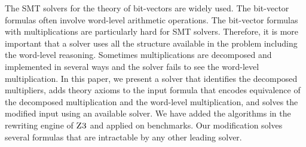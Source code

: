 %
The SMT solvers for the theory of bit-vectors are widely used.
%
The bit-vector formulas often involve word-level arithmetic
operations.
%
The bit-vector formulas with multiplications
are particularly hard for SMT solvers.
%
Therefore, it is more important that a solver uses all 
the structure available in the problem including the
word-level reasoning.
%
Sometimes multiplications are decomposed and implemented in several
ways and the solver fails to see the word-level multiplication. 
%
In this paper, we present a solver that identifies the decomposed
multipliers, adds theory axioms to the input formula that encodes
equivalence of the decomposed multiplication and the word-level
multiplication, and solves the modified input using an available
solver.
%
We have added the algorithms in the rewriting engine of $\textsc{Z3}$
and applied on benchmarks.
%
Our modification solves several formulas that are
intractable by any other leading solver.
%


